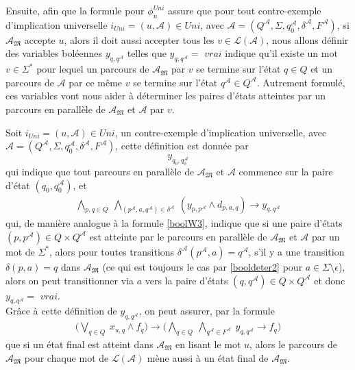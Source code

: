 \documentclass[12pt,a4paper,oneside,titlepage]{report}
\begin{document}
\noindent Ensuite, afin que la formule pour $\phi_n^{Uni}$ assure que pour tout contre-exemple d'implication universelle $i_{Uni}=(u,\mathcal{A}) \in Uni$, avec $\mathcal{A}=(Q^\mathcal{A},\Sigma,q_0^\mathcal{A},\delta^\mathcal{A},F^\mathcal{A})$, si $\mathcal{A}_\mathfrak{M}$ accepte $u$, alors il doit aussi accepter tous les $v\in\mathcal{L}(\mathcal{A})$, nous allons définir des variables boléennes $y_{q,q^\mathcal{A}}$ telles que $y_{q,q^\mathcal{A}}=$ $vrai$ indique qu'il existe un mot $v\in\Sigma^*$ pour lequel un parcours de $\mathcal{A}_\mathfrak{M}$ par $v$ se termine sur l'état $q\in Q$ et un parcours de $\mathcal{A}$ par ce même $v$ se termine sur l'état $q^\mathcal{A}\in Q^\mathcal{A}$. Autrement formulé, ces variables vont nous aider à déterminer les paires d'états atteintes par un parcours en parallèle de $\mathcal{A}_\mathfrak{M}$ et $\mathcal{A}$ par $v$. 

\noindent Soit $i_{Uni}=(u,\mathcal{A}) \in Uni$, un contre-exemple d'implication universelle, avec $\mathcal{A}=(Q^\mathcal{A},\Sigma,q_0^\mathcal{A},\delta^\mathcal{A},F^\mathcal{A})$, cette définition est donnée par
\begin{equation}
\label{booluni1}
y_{q_0,q_0^\mathcal{A}}
\end{equation}
qui indique que tout parcours en parallèle de $\mathcal{A}_\mathfrak{M}$ et $\mathcal{A}$ commence sur la paire d'état $(q_0,q_0^\mathcal{A})$, et 
\begin{equation}
\label{booluni2}
\begin{aligned}
\bigwedge_{p,q\in Q}~ \bigwedge_{(p^\mathcal{A},a,q^\mathcal{A})\in\delta^\mathcal{A}}~ (y_{p,p^\mathcal{A}}\land d_{p,a,q})\rightarrow y_{q,q^\mathcal{A}}
\end{aligned}
\end{equation}
qui, de manière analogue à la formule \ref{boolW3}, indique que si une paire d'états $(p,p^\mathcal{A})\in Q\times Q^\mathcal{A}$ est atteinte par le parcours en parallèle de $\mathcal{A}_\mathfrak{M}$ et $\mathcal{A}$ par un mot de $\Sigma^*$, alors pour toutes transitions $\delta^\mathcal{A}(p^\mathcal{A},a)=q^\mathcal{A}$, s'il y a une transition $\delta(p,a)=q$ dans $\mathcal{A}_\mathfrak{M}$ (ce qui est toujours le cas par \ref{booldeter2} pour $a\in\Sigma\setminus\epsilon$), alors on peut transitionner via $a$ vers la paire d'états $(q,q^\mathcal{A})\in Q\times Q^\mathcal{A}$ et donc $y_{q,q^\mathcal{A}}=$ $vrai$.\\

\noindent Grâce à cette définition de $y_{q,q^\mathcal{A}}$, on peut assurer, par la formule 
\begin{equation}
\label{booluni3}
\begin{aligned} \bigl ( \bigvee _{q \in Q}~ x_{u, q} \wedge f_q \bigr ) \rightarrow \bigl ( \bigwedge _{q \in Q}~ \bigwedge _{q^\mathcal{A} \in F^\mathcal A}~ y_{q, q^\mathcal{A}} \rightarrow f_q \bigr ) \end{aligned}
\end{equation}
que si un état final est atteint dans $\mathcal{A}_\mathfrak{M}$ en lisant le mot $u$, alors le parcours de $\mathcal{A}_\mathfrak{M}$ pour chaque mot de $\mathcal{L}(\mathcal{A})$ mène aussi à un état final de $\mathcal{A}_\mathfrak{M}$.\\
\end{document}
